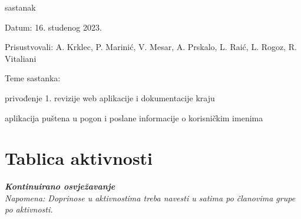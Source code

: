 \begin{packed_enum}
	\item  sastanak
	\item[] \begin{packed_item}
		\item Datum: 16. studenog 2023.
		\item Prisustvovali: A. Krklec, P. Marinić, V. Mesar, A. Prskalo, L. Raić, L. Rogoz, R. Vitaliani
		\item Teme sastanka:
		\begin{packed_item}
			\item privođenje 1. revizije web aplikacije i dokumentacije kraju
			\item aplikacija puštena u pogon i poslane informacije o korisničkim imenima
		\end{packed_item}
	\end{packed_item}
	
	
\end{packed_enum}

\eject
\section*{Tablica aktivnosti}

\textbf{\textit{Kontinuirano osvježavanje}}\\

\textit{Napomena: Doprinose u aktivnostima treba navesti u satima po članovima grupe po aktivnosti.}

